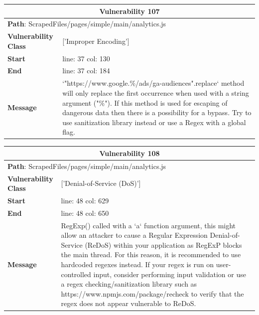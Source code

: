 \documentclass[12pt]{article}
\begin{document}
\vspace{0.7cm}
\FloatBarrier
\begin{table}[!h]
\centering
\renewcommand{\arraystretch}{1.3}
\begin{tabular}{|l|p{10cm}|}
\hline
\multicolumn{2}{|c|}{\textbf{Vulnerability 107}} \\
\hline
\multicolumn{2}{|l|}{\textbf{Path}: ScrapedFiles/pages/simple/main/analytics.js} \\
\hline
\textbf{Vulnerability Class} & ['Improper Encoding'] \\
\hline
\textbf{Start} & line: 37 \quad col: 130 \\
\hline
\textbf{End} & line: 37 \quad col: 184 \\
\hline
\textbf{Message} & `"https://www.google.\%/ads/ga-audiences".replace` method will only replace the first occurrence when used with a string argument ("\%"). If this method is used for escaping of dangerous data then there is a possibility for a bypass. Try to use sanitization library instead or use a Regex with a global flag. \\
\hline
\end{tabular}
\end{table}
\vspace{0.7cm}
\FloatBarrier
\begin{table}[!h]
\centering
\renewcommand{\arraystretch}{1.3}
\begin{tabular}{|l|p{10cm}|}
\hline
\multicolumn{2}{|c|}{\textbf{Vulnerability 108}} \\
\hline
\multicolumn{2}{|l|}{\textbf{Path}: ScrapedFiles/pages/simple/main/analytics.js} \\
\hline
\textbf{Vulnerability Class} & ['Denial-of-Service (DoS)'] \\
\hline
\textbf{Start} & line: 48 \quad col: 629 \\
\hline
\textbf{End} & line: 48 \quad col: 650 \\
\hline
\textbf{Message} & RegExp() called with a `a` function argument, this might allow an attacker to cause a Regular Expression Denial-of-Service (ReDoS) within your application as RegExP blocks the main thread. For this reason, it is recommended to use hardcoded regexes instead. If your regex is run on user-controlled input, consider performing input validation or use a regex checking/sanitization library such as https://www.npmjs.com/package/recheck to verify that the regex does not appear vulnerable to ReDoS. \\
\hline
\end{tabular}
\end{table}
\end{document}
